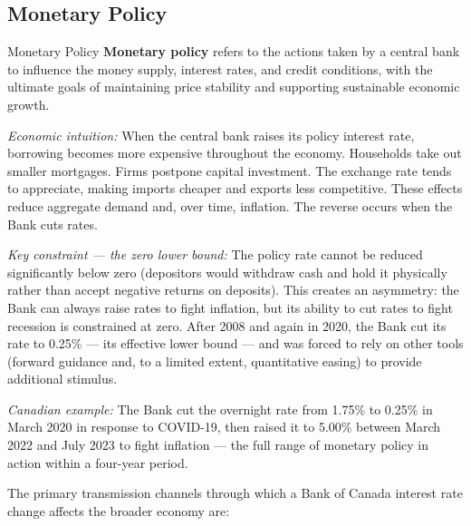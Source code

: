 \subsection{Monetary Policy}

\begin{defbox}{Monetary Policy}
\textbf{Monetary policy} refers to the actions taken by a central bank
to influence the money supply, interest rates, and credit conditions,
with the ultimate goals of maintaining price stability and supporting
sustainable economic growth.

\textit{Economic intuition:} When the central bank raises its policy
interest rate, borrowing becomes more expensive throughout the economy.
Households take out smaller mortgages. Firms postpone capital investment.
The exchange rate tends to appreciate, making imports cheaper and exports
less competitive. These effects reduce aggregate demand and, over time,
inflation. The reverse occurs when the Bank cuts rates.

\textit{Key constraint --- the zero lower bound:} The policy rate cannot
be reduced significantly below zero (depositors would withdraw cash and
hold it physically rather than accept negative returns on deposits). This
creates an asymmetry: the Bank can always raise rates to fight inflation,
but its ability to cut rates to fight recession is constrained at zero.
After 2008 and again in 2020, the Bank cut its rate to 0.25\% --- its
effective lower bound --- and was forced to rely on other tools (forward
guidance and, to a limited extent, quantitative easing) to provide
additional stimulus.

\textit{Canadian example:} The Bank cut the overnight rate from 1.75\%
to 0.25\% in March 2020 in response to COVID-19, then raised it to 5.00\%
between March 2022 and July 2023 to fight inflation --- the full range of
monetary policy in action within a four-year period.
\end{defbox}

The primary transmission channels through which a Bank of Canada interest
rate change affects the broader economy are:

